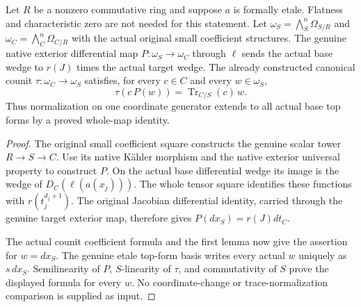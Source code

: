 \begin{theorem}
\label{thm:kn-nadel-etale-all-topforms-trace-normalization}
\leanok
Let $R$ be a nonzero commutative ring and suppose $a$ is formally etale.
Flatness and characteristic zero are not needed for this statement.  Let
$\omega_S=\bigwedge^n_S\Omega_{S/R}$ and
$\omega_C=\bigwedge^n_C\Omega_{C/R}$ with the actual original small
coefficient structures.  The genuine native exterior differential
map $P:\omega_S\to\omega_C$ through $\ell$ sends the actual base
wedge to $r(J)$ times the actual target wedge.  The already constructed
canonical counit $\tau:\omega_C\to\omega_S$ satisfies, for every
$c\in C$ and every $w\in\omega_S$,
\[
 \tau(c\,P(w))=\operatorname{Tr}_{C/S}(c)\,w.
\]
Thus normalization on one coordinate generator extends to all actual
base top forms by a proved whole-map identity.
\end{theorem}
\begin{proof}
The original small coefficient square constructs the genuine scalar
tower $R\to S\to C$.  Use its native K\"ahler morphism and the native
exterior universal property to construct $P$.  On the actual base
differential wedge its image is the wedge of $D_C(\ell(a(x_j)))$.
The whole tensor square identifies these functions with
$r(t_j^{d_j+1})$.  The original Jacobian differential identity, carried
through the genuine target exterior map, therefore gives
$P(dx_S)=r(J)dt_C$.

The actual counit coefficient formula and the first lemma now give
the assertion for $w=dx_S$.  The genuine etale top-form basis writes
every actual $w$ uniquely as $s\,dx_S$.  Semilinearity of $P$,
$S$-linearity of $\tau$, and commutativity of $S$ prove the displayed
formula for every $w$.  No coordinate-change or trace-normalization
comparison is supplied as input.
\end{proof}

